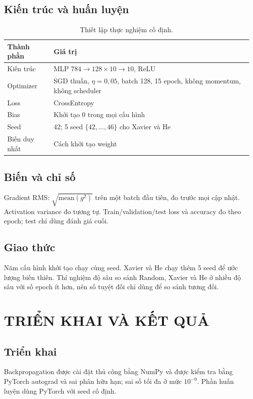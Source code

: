 \documentclass[12pt,a4paper]{report}
\begin{document}
\section{Kiến trúc và huấn luyện}
\begin{table}[H]
\centering
\begin{tabular}{ll}
\toprule
Thành phần & Giá trị \\
\midrule
Kiến trúc & MLP $784\to128\times10\to10$, ReLU \\
Optimizer & SGD thuần, $\eta=0{,}05$, batch 128, 15 epoch, không momentum, không scheduler \\
Loss & CrossEntropy \\
Bias & Khởi tạo 0 trong mọi cấu hình \\
Seed & 42; 5 seed $\{42,\dots,46\}$ cho Xavier và He \\
Biến duy nhất & Cách khởi tạo weight \\
\bottomrule
\end{tabular}
\caption{Thiết lập thực nghiệm cố định.}
\label{tab:setup}
\end{table}

\section{Biến và chỉ số}
Gradient RMS: $\sqrt{\mathrm{mean}(g^2)}$ trên một batch đầu tiên, đo trước mọi cập nhật. Activation variance đo tương tự. Train/validation/test loss và accuracy đo theo epoch; test chỉ dùng đánh giá cuối.

\section{Giao thức}
Năm cấu hình khởi tạo chạy cùng seed. Xavier và He chạy thêm 5 seed để ước lượng biến thiên. Thí nghiệm độ sâu so sánh Random, Xavier và He ở nhiều độ sâu với số epoch ít hơn, nên số tuyệt đối chỉ dùng để so sánh tương đối.

\chapter{TRIỂN KHAI VÀ KẾT QUẢ}

\section{Triển khai}
Backpropagation được cài đặt thủ công bằng NumPy và được kiểm tra bằng PyTorch autograd và sai phân hữu hạn; sai số tối đa ở mức $10^{-9}$. Phần huấn luyện dùng PyTorch với seed cố định.
\end{document}
